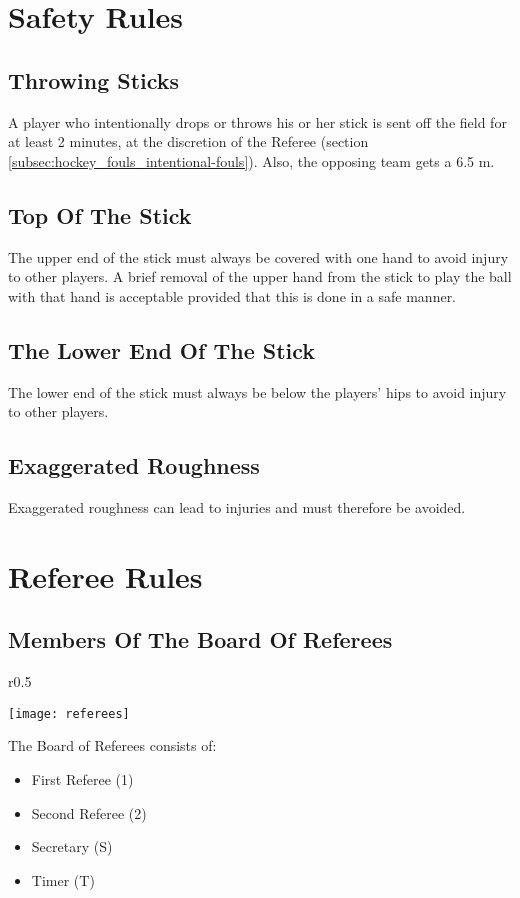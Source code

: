 \section{Safety Rules}

\subsection{Throwing Sticks}
A player who intentionally drops or throws his or her stick is sent off the field for at least 2 minutes, at the discretion of the Referee (section \ref{subsec:hockey_fouls_intentional-fouls}).
Also, the opposing team gets a 6.5 m.

\subsection{Top Of The Stick}
The upper end of the stick must always be covered with one hand to avoid injury to other players.
A brief removal of the upper hand from the stick to play the ball with that hand is acceptable provided that this is done in a safe manner.

\subsection{The Lower End Of The Stick}
The lower end of the stick must always be below the players' hips to avoid injury to other players.

\subsection{Exaggerated Roughness}
Exaggerated roughness can lead to injuries and must therefore be avoided.

\section{Referee Rules}

 \subsection{Members Of The Board Of Referees}
\begin{wrapfigure}{r}{0.5\textwidth}
\begin{center}
\texttt{[image: referees]}
\end{center}
\end{wrapfigure}
 The Board of Referees consists of:
\begin{itemize}
\item First Referee (1) 
\item Second Referee (2)
\item Secretary (S)
\item Timer (T)
\end{itemize} 

